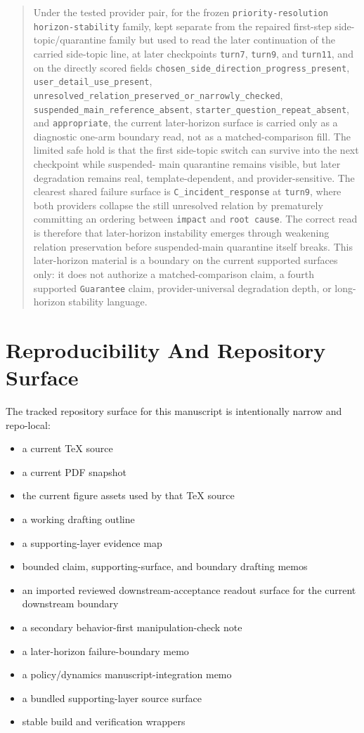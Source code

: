 \documentclass[11pt]{article}
\begin{document}
\begin{quote}
Under the tested provider pair, for the frozen
\texttt{priority-resolution horizon-stability} family, kept separate from the
repaired first-step side-topic/quarantine family but used to read the later
continuation of the carried side-topic line, at later checkpoints
\texttt{turn7}, \texttt{turn9}, and \texttt{turn11}, and on the directly scored
fields \texttt{chosen\_side\_direction\_progress\_present},
\texttt{user\_detail\_use\_present},
\texttt{unresolved\_relation\_preserved\_or\_narrowly\_checked},
\texttt{suspended\_main\_reference\_absent},
\texttt{starter\_question\_repeat\_absent}, and \texttt{appropriate}, the
current later-horizon surface is carried only as a diagnostic one-arm boundary
read, not as a matched-comparison fill. The limited safe hold is that the
first side-topic switch can survive into the next checkpoint while suspended-
main quarantine remains visible, but later degradation remains real,
template-dependent, and provider-sensitive. The clearest shared failure surface
is \texttt{C\_incident\_response} at \texttt{turn9}, where both providers
collapse the still unresolved relation by prematurely committing an ordering
between \texttt{impact} and \texttt{root cause}. The correct read is therefore
that later-horizon instability emerges through weakening relation preservation
before suspended-main quarantine itself breaks. This later-horizon material is
a boundary on the current supported surfaces only: it does not authorize a
matched-comparison claim, a fourth supported \texttt{Guarantee} claim,
provider-universal degradation depth, or long-horizon stability language.
\end{quote}

\section{Reproducibility And Repository Surface}

The tracked repository surface for this manuscript is intentionally narrow and
repo-local:
\begin{itemize}
\item a current TeX source
\item a current PDF snapshot
\item the current figure assets used by that TeX source
\item a working drafting outline
\item a supporting-layer evidence map
\item bounded claim, supporting-surface, and boundary drafting memos
\item an imported reviewed downstream-acceptance readout surface for the
current downstream boundary
\item a secondary behavior-first manipulation-check note
\item a later-horizon failure-boundary memo
\item a policy/dynamics manuscript-integration memo
\item a bundled supporting-layer source surface
\item stable build and verification wrappers
\end{itemize}
\end{document}
